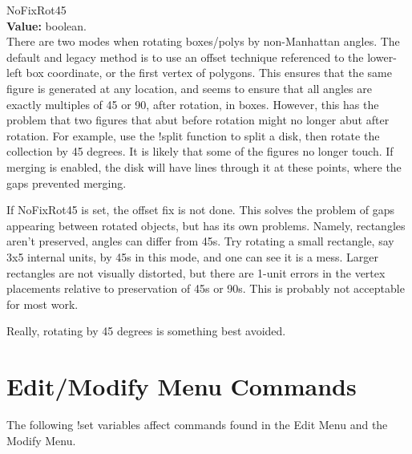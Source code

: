 \begin{description}
\item{\et NoFixRot45}\\
{\bf Value:} boolean.\\
There are two modes when rotating boxes/polys by non-Manhattan angles. 
The default and legacy method is to use an offset technique referenced
to the lower-left box coordinate, or the first vertex of polygons. 
This ensures that the same figure is generated at any location, and
seems to ensure that all angles are exactly multiples of 45 or 90,
after rotation, in boxes.  However, this has the problem that two
figures that abut before rotation might no longer abut after rotation. 
For example, use the {\cb !split} function to split a disk, then
rotate the collection by 45 degrees.  It is likely that some of the
figures no longer touch.  If merging is enabled, the disk will have
lines through it at these points, where the gaps prevented merging.

If {\et NoFixRot45} is set, the offset fix is not done.  This solves
the problem of gaps appearing between rotated objects, but has its own
problems.  Namely, rectangles aren't preserved, angles can differ from
45s.  Try rotating a small rectangle, say 3x5 internal units, by 45s
in this mode, and one can see it is a mess.  Larger rectangles are not
visually distorted, but there are 1-unit errors in the vertex
placements relative to preservation of 45s or 90s.  This is probably
not acceptable for most work.

Really, rotating by 45 degrees is something best avoided.
\end{description}


\section{Edit/Modify Menu Commands}

The following {\cb !set} variables affect commands found in the
{\cb Edit Menu} and the {\cb Modify Menu}.

